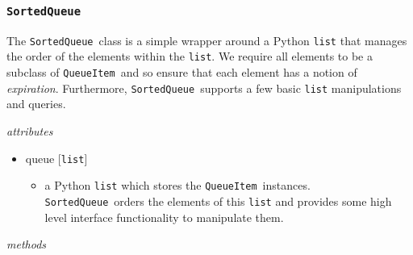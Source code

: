 \documentclass{article}
\newcommand{\SortedQueue}{\texttt{SortedQueue}~}
\newcommand{\QueueItem}{\texttt{QueueItem}~}
\begin{document}

\subsubsection{\SortedQueue}
\label{sec: SortedQueue}

The \SortedQueue class is a simple wrapper around a Python \texttt{list} that manages the order of the elements within the \texttt{list}.
We require all elements to be a subclass of \QueueItem and so ensure that each element has a notion of \textit{expiration}.
Furthermore, \SortedQueue supports a few basic \texttt{list} manipulations and queries.

\vspace{0.5cm}
\noindent
\textit{attributes}

\begin{itemize}
    \item{queue [\texttt{list}]
        \begin{itemize}
            \item{a Python \texttt{list} which stores the \QueueItem instances. \SortedQueue orders the elements of this \texttt{list} and provides some high level interface functionality to manipulate them.}
        \end{itemize}
         }
\end{itemize}

\noindent
\textit{methods}
\end{document}
